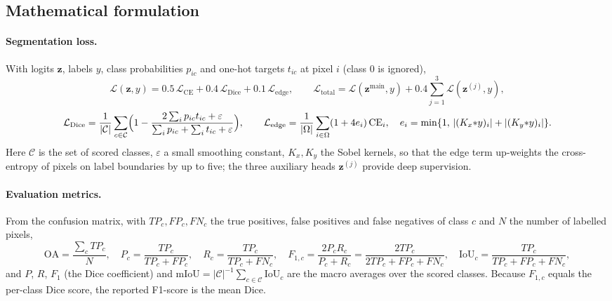 \documentclass[12pt,a4paper]{article}
\begin{document}
\subsection{Mathematical formulation}
\paragraph{Segmentation loss.} With logits $\mathbf z$, labels $y$, class probabilities $p_{ic}$ and one-hot targets $t_{ic}$ at pixel $i$ (class 0 is ignored),
\begin{equation}
\mathcal L(\mathbf z,y)=0.5\,\mathcal L_{\mathrm{CE}}+0.4\,\mathcal L_{\mathrm{Dice}}+0.1\,\mathcal L_{\mathrm{edge}},\qquad
\mathcal L_{\mathrm{total}}=\mathcal L(\mathbf z^{\mathrm{main}},y)+0.4\sum_{j=1}^{3}\mathcal L(\mathbf z^{(j)},y),
\label{eq:loss}
\end{equation}
\begin{equation}
\mathcal L_{\mathrm{Dice}}=\frac1{|\mathcal C|}\sum_{c\in\mathcal C}\Bigl(1-\frac{2\sum_i p_{ic}t_{ic}+\varepsilon}{\sum_i p_{ic}+\sum_i t_{ic}+\varepsilon}\Bigr),\qquad
\mathcal L_{\mathrm{edge}}=\frac1{|\Omega|}\sum_{i\in\Omega}(1+4e_i)\,\mathrm{CE}_i,\quad e_i=\min\{1,\,|(K_x{*}y)_i|+|(K_y{*}y)_i|\}.
\label{eq:diceedge}
\end{equation}
Here $\mathcal C$ is the set of scored classes, $\varepsilon$ a small smoothing constant, $K_x,K_y$ the Sobel kernels, so that the edge term up-weights the cross-entropy of pixels on label boundaries by up to five; the three auxiliary heads $\mathbf z^{(j)}$ provide deep supervision.

\paragraph{Evaluation metrics.} From the confusion matrix, with $TP_c,FP_c,FN_c$ the true positives, false positives and false negatives of class $c$ and $N$ the number of labelled pixels,
\begin{equation}
\mathrm{OA}=\frac{\sum_c TP_c}{N},\quad P_c=\frac{TP_c}{TP_c+FP_c},\quad R_c=\frac{TP_c}{TP_c+FN_c},\quad F_{1,c}=\frac{2P_cR_c}{P_c+R_c}=\frac{2TP_c}{2TP_c+FP_c+FN_c},\quad \mathrm{IoU}_c=\frac{TP_c}{TP_c+FP_c+FN_c},
\label{eq:metrics}
\end{equation}
and $P$, $R$, $F_1$ (the Dice coefficient) and $\mathrm{mIoU}=|\mathcal C|^{-1}\sum_{c\in\mathcal C}\mathrm{IoU}_c$ are the macro averages over the scored classes. Because $F_{1,c}$ equals the per-class Dice score, the reported F1-score is the mean Dice.
\end{document}
